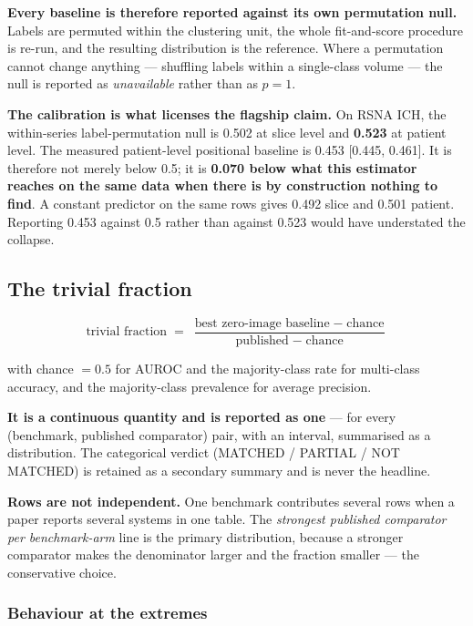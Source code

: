 \documentclass[11pt,a4paper]{article}
\begin{document}
\textbf{Every baseline is therefore reported against its own permutation null.} Labels
are permuted within the clustering unit, the whole fit-and-score procedure is re-run,
and the resulting distribution is the reference. Where a permutation cannot change
anything --- shuffling labels within a single-class volume --- the null is reported as
\emph{unavailable} rather than as $p = 1$.

\textbf{The calibration is what licenses the flagship claim.} On RSNA ICH, the
within-series label-permutation null is 0.502 at slice level and \textbf{0.523} at
patient level. The measured patient-level positional baseline is 0.453
[0.445, 0.461]. It is therefore not merely below 0.5; it is \textbf{0.070 below what
this estimator reaches on the same data when there is by construction nothing to
find}. A constant predictor on the same rows gives 0.492 slice and 0.501 patient.
Reporting 0.453 against 0.5 rather than against 0.523 would have understated the
collapse.

\subsection{The trivial fraction}

\begin{equation}
\text{trivial fraction} \;=\; \frac{\text{best zero-image baseline} \;-\; \text{chance}}
                                    {\text{published} \;-\; \text{chance}}
\end{equation}

with chance $=0.5$ for AUROC and the majority-class rate for multi-class accuracy, and
the majority-class prevalence for average precision.

\textbf{It is a continuous quantity and is reported as one} --- for every (benchmark,
published comparator) pair, with an interval, summarised as a distribution. The
categorical verdict (MATCHED / PARTIAL / NOT MATCHED) is retained as a secondary
summary and is never the headline.

\textbf{Rows are not independent.} One benchmark contributes several rows when a paper
reports several systems in one table. The \emph{strongest published comparator per
benchmark-arm} line is the primary distribution, because a stronger comparator makes
the denominator larger and the fraction smaller --- the conservative choice.

\subsubsection*{Behaviour at the extremes}
\end{document}
